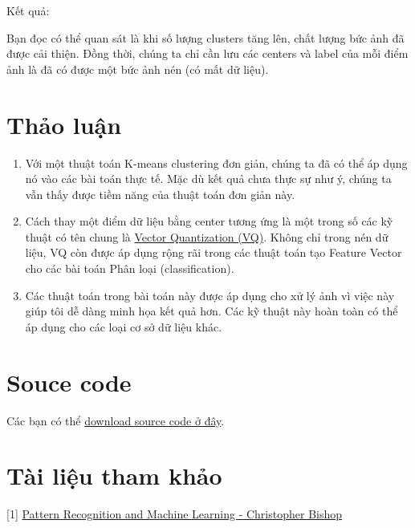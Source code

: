  
Kết quả:  
 
 
Bạn đọc có thể quan sát là khi số lượng clusters tăng lên, chất lượng bức ảnh đã được cải thiện. Đồng thời, chúng ta chỉ cần lưu các centers và label của mỗi điểm ảnh là đã có được một bức ảnh nén (có mất dữ liệu).  
 
 
\section{Thảo luận}
\begin{enumerate}
	\item Với một thuật toán K-means clustering đơn giản, chúng ta đã có thể áp dụng nó vào các bài toán thực tế. Mặc dù kết quả chưa thực sự như ý, chúng ta vẫn thấy được tiềm năng của thuật toán đơn giản này.

	\item Cách thay một điểm dữ liệu bằng center tương ứng là một trong số các kỹ thuật có tên chung là \href{https://en.wikipedia.org/wiki/Vector_quantization}{Vector Quantization (VQ)}. Không chỉ trong nén dữ liệu, VQ còn được áp dụng rộng rãi trong các thuật toán tạo Feature Vector cho các bài toán Phân loại (classification).   

	\item Các thuật toán trong bài toán này được áp dụng cho xử lý ảnh vì việc này giúp tôi dễ dàng minh họa kết quả hơn. Các kỹ thuật này hoàn toàn có thể áp dụng cho các loại cơ sở dữ liệu khác.  
\end{enumerate}
 
 
\section{Souce code}
Các bạn có thể \href{https://github.com/tiepvupsu/tiepvupsu.github.io/blob/master/assets/kmeans/Kmeans2.ipynb}{download source code ở đây}.  
 
 
\section{Tài liệu tham khảo }
 
[1] \href{http://users.isr.ist.utl.pt/~wurmd/Livros/school/Bishop%20-%20Pattern%20Recognition%20And%20Machine%20Learning%20-%20Springer%20%202006.pdf}{Pattern Recognition and Machine Learning - Christopher Bishop} 
